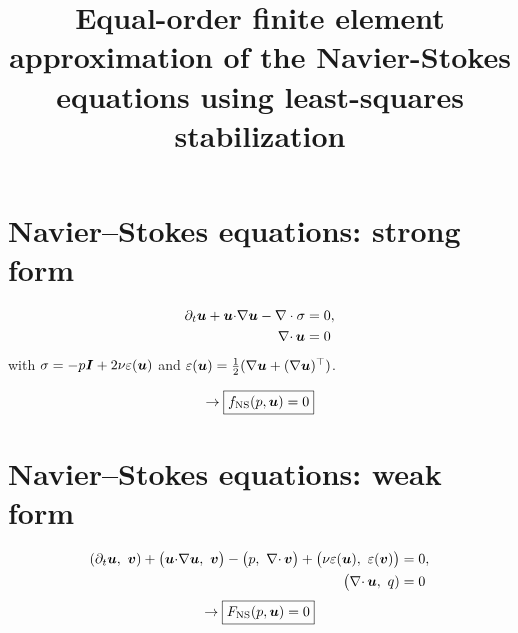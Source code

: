 \documentclass[review,onefignum,onetabnum]{siamart190516}
\title{Equal-order finite element approximation of the Navier-Stokes equations using least-squares stabilization}
\begin{document}
\maketitle


\renewcommand{\thefootnote}{\fnsymbol{footnote}} 
\renewcommand{\thefootnote}{\arabic{footnote}}

\tableofcontents

%
%

\pagestyle{myheadings}
\thispagestyle{plain}

\section{Navier--Stokes equations: strong form}


\begin{equation}
  \begin{aligned}
    \partial_t {\boldsymbol u}  + {\boldsymbol u} {\cdot} \nabla {\boldsymbol u} 
    - \nabla \cdot \sigma &=0, \\
    \hspace{2.2em} 
    \nabla{\cdot\,} {\boldsymbol u}&= 0 
  \end{aligned}
\end{equation}
with $\sigma = -p \bm I + 2 \nu \varepsilon({\boldsymbol u})$ and
$\varepsilon({\boldsymbol u})=\frac{1}{2}(\nabla {\boldsymbol u} + (\nabla {\boldsymbol u})^\top)$.

\begin{align*} 
\rightarrow \boxed{f_{\text{NS}}(p,{\boldsymbol u})= 0}
\end{align*}

\section{Navier--Stokes equations: weak form}


\begin{equation}
  \begin{aligned}
    \left( \partial_t {\boldsymbol u} ,\  {\boldsymbol v} \right) 
    + \big( {\boldsymbol u} {\cdot} \nabla {\boldsymbol u},\ {\boldsymbol v} \big)
    - \big( p,\ \nabla{\cdot\,} {\boldsymbol v} \big) + 
    \big( \nu \varepsilon({\boldsymbol u}),\ \varepsilon({\boldsymbol v}) \big)&=0, \\
    \big( \nabla{\cdot\,} {\boldsymbol u},\ q)&  = 0 
  \end{aligned}
\end{equation}
\begin{align*} 
\rightarrow \boxed{F_{\text{NS}}(p,{\boldsymbol u})= 0}
\end{align*}
\end{document}
